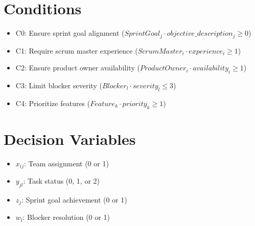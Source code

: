 \documentclass{article}
\begin{document}
\section{Conditions}
\begin{itemize}
    \item C0: Ensure sprint goal alignment ($SprintGoal_{j} \cdot objective\_description_{j} \geq 0$)
    \item C1: Require scrum master experience ($ScrumMaster_{i} \cdot experience_{i} \geq 1$)
    \item C2: Ensure product owner availability ($ProductOwner_{i} \cdot availability_{i} \geq 1$)
    \item C3: Limit blocker severity ($Blocker_{l} \cdot severity_{l} \leq 3$)
    \item C4: Prioritize features ($Feature_{k} \cdot priority_{k} \geq 1$)
\end{itemize}

\section{Decision Variables}
\begin{itemize}
    \item $x_{ij}$: Team assignment (0 or 1)
    \item $y_{jl}$: Task status (0, 1, or 2)
    \item $z_{j}$: Sprint goal achievement (0 or 1)
    \item $w_{l}$: Blocker resolution (0 or 1)
\end{itemize}
\end{document}
